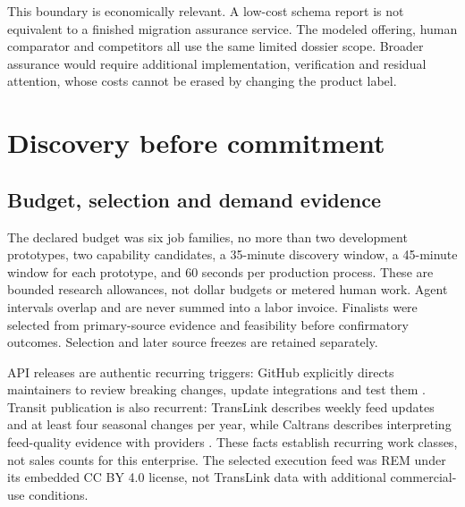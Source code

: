 \documentclass[11pt,letterpaper]{article}
\begin{document}
This boundary is economically relevant. A low-cost schema report is not equivalent to a
finished migration assurance service. The modeled offering, human comparator and competitors
all use the same limited dossier scope. Broader assurance would require additional implementation,
verification and residual attention, whose costs cannot be erased by changing the product label.

\section{Discovery before commitment}

\subsection{Budget, selection and demand evidence}

The declared budget was six job families, no more than two development prototypes, two
capability candidates, a 35-minute discovery window, a 45-minute window for each prototype,
and 60 seconds per production process. These are bounded research allowances, not dollar
budgets or metered human work. Agent intervals overlap and are never summed into a labor invoice.
Finalists were selected from primary-source evidence and feasibility before confirmatory
outcomes. Selection and later source freezes are retained separately.

API releases are authentic recurring triggers: GitHub explicitly directs maintainers to review
breaking changes, update integrations and test them \cite{github-versions}. Transit publication
is also recurrent: TransLink describes weekly feed updates and at least four seasonal changes
per year, while Caltrans describes interpreting feed-quality evidence with providers
\cite{translink,caltrans}. These facts establish recurring work classes, not sales counts for
this enterprise. The selected execution feed was REM under its embedded CC BY 4.0 license,
not TransLink data with additional commercial-use conditions.
\end{document}
